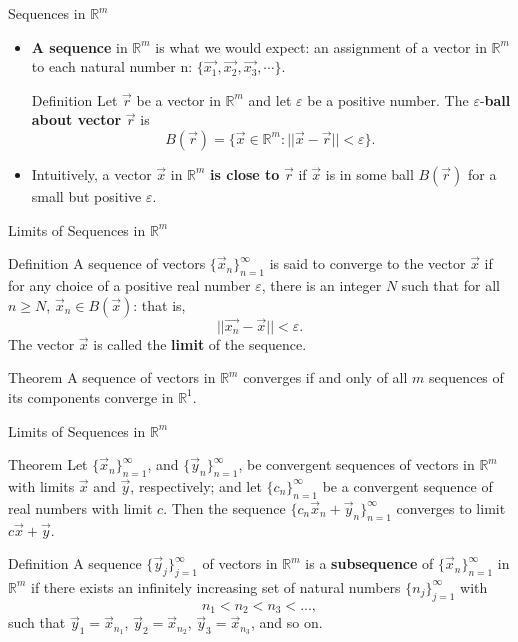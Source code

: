 \documentclass{beamer}
\begin{document}
\begin{frame}{Sequences in $\mathbb{R}^m$}
    \begin{itemize}
        \item \textbf{A sequence} in $\mathbb{R}^m$ is what we would expect: an assignment of a vector in $\mathbb{R}^m$ to each natural number n: $\{\vec{x_1}, \vec{x_2},\vec{x_3},\cdots\}$.  
        \begin{block}{Definition}
            Let $\vec{r}$ be a vector in $\mathbb{R}^m$ and let $\varepsilon$ be a positive number. The $\varepsilon$-\textbf{ball about vector }$\vec{r} $ is 
            \[B(\vec{r})=\{\vec{x}\in \mathbb{R}^m: ||\vec{x}-\vec{r}||<\varepsilon\}.\
            \]
        \end{block}
        \item Intuitively, a vector $\vec{x}$ in $\mathbb{R}^m$ \textbf{is close to} $\vec{r}$ if $\vec{x} $ is in some ball $B(\vec{r})$ for a small but positive $\varepsilon$.
    \end{itemize}
    \end{frame}

\begin{frame}{Limits of Sequences in $\mathbb{R}^m$}
\begin{block}
{Definition} A sequence of vectors $\{\vec{x}_n\}_{n=1}^\infty$ is said to converge to the vector $\vec{x}$ if for any choice of a positive real number $\varepsilon$, there is an integer $N$ such that for all $n\geq N$, $\vec{x}_n\in B(\vec{x})$: that is,
\[||\vec{x_n}-\vec{x}||<\varepsilon.
\]
The vector $\vec{x}$ is called the \textbf{limit} of the sequence. 
\end{block}
\begin{block}
{Theorem} A sequence of vectors in $\mathbb{R}^m$ converges if and only of all $m$ sequences of its components converge in $\mathbb{R}^1$.
\end{block}
  \end{frame}

\begin{frame}{Limits of Sequences in $\mathbb{R}^m$}
\begin{block}
{Theorem}
Let $\{\vec{x}_n\}_{n=1}^\infty$, and $\{\vec{y}_n\}_{n=1}^\infty$, be convergent sequences of vectors in $\mathbb{R}^m$ with limits $\vec{x}$ and $\vec{y}$, respectively; and let $\{c_n\}_{n=1}^\infty$ be a convergent sequence of real numbers with limit $c$. Then the sequence $\{c_n\vec{x}_n+\vec{y}_n\}_{n=1}^\infty$ converges to limit $c\vec{x}+\vec{y}$. 
\end{block}
\begin{block}{Definition}
A sequence $\{\vec{y}_j\}_{j=1}^\infty$ of vectors in $\mathbb{R}^m$ is a \textbf{subsequence } of $\{\vec{x}_n\}_{n=1}^\infty$ in $\mathbb{R}^m$ if there exists an infinitely increasing set of natural numbers $\{n_j\}_{j=1}^\infty$ with 
\[n_1<n_2<n_3<...,
\]
such that $\vec{y}_1=\vec{x}_{n_1}$, $\vec{y}_2=\vec{x}_{n_2}$, $\vec{y}_3=\vec{x}_{n_3}$, and so on.
\end{block}

\end{frame}
\end{document}
